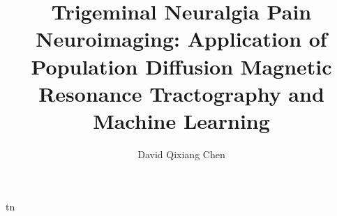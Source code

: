 \documentclass[12pt]{ut-thesis}
\begin{document}
\nobibliography*
\begin{preliminary}
    

\author{David Qixiang Chen}
\title{Trigeminal Neuralgia Pain Neuroimaging: Application of Population Diffusion Magnetic Resonance Tractography and Machine Learning}


\maketitle
\tableofcontents

\end{preliminary}

\glsaddall
{}

\printglossary[type=\acronymtype]
\printglossary

\Gls{tn}















\end{document}
